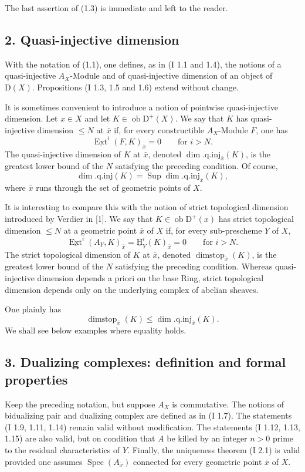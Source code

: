 \documentclass[11pt]{article}
\providecommand{\uH}{\underline{\mathrm H}}
\DeclareMathOperator{\Ext}{Ext}
\DeclareMathOperator{\Spec}{Spec}
\newcommand{\D}{\mathrm{D}}
\newcommand{\ob}{\operatorname{ob}}
\providecommand{\ob}{\operatorname{ob}}
\providecommand{\Spec}{\operatorname{Spec}}
\providecommand{\Spec}{\operatorname{Spec}}
\providecommand{\Spec}{\operatorname{Spec}}
\providecommand{\Spec}{\operatorname{Spec}}
\begin{document}
The last assertion of (1.3) is immediate and left to the reader.

\subsection*{2. Quasi-injective dimension}

With the notation of (1.1), one defines, as in (I 1.1 and 1.4), the notions of a quasi-injective $A_X$-Module and of quasi-injective dimension of an object of $\D(X)$. Propositions (I 1.3, 1.5 and 1.6) extend without change.

It is sometimes convenient to introduce a notion of pointwise quasi-injective dimension. Let $x\in X$ and let $K\in\ob\D^+(X)$. We say that $K$ has quasi-injective dimension $\leq N$ at $\bar{x}$ if, for every constructible $A_X$-Module $F$, one has
\[
        \underline{\Ext}^{i}(F,K)_{\bar{x}}=0\qquad\text{for }i>N.
\]
The quasi-injective dimension of $K$ at $\bar{x}$, denoted $\dim.\mathrm{q.inj}_{\bar{x}}(K)$, is the greatest lower bound of the $N$ satisfying the preceding condition. Of course,
\[
        \dim.\mathrm{q.inj}(K)=\operatorname{Sup}\dim.\mathrm{q.inj}_{\bar{x}}(K),
\]
where $\bar{x}$ runs through the set of geometric points of $X$.

It is interesting to compare this with the notion of strict topological dimension introduced by Verdier in [1]. We say that $K\in\ob\D^+(x)$ has strict topological dimension $\leq N$ at a geometric point $\bar{x}$ of $X$ if, for every sub-prescheme $Y$ of $X$,
\[
        \underline{\Ext}^{i}(A_Y,K)_{\bar{x}}=\uH^i_Y(K)_{\bar{x}}=0\qquad\text{for }i>N.
\]
The strict topological dimension of $K$ at $\bar{x}$, denoted $\operatorname{dimstop}_{\bar{x}}(K)$, is the greatest lower bound of the $N$ satisfying the preceding condition. Whereas quasi-injective dimension depends a priori on the base Ring, strict topological dimension depends only on the underlying complex of abelian sheaves.

One plainly has
\[
        \operatorname{dimstop}_{\bar{x}}(K)\leq \dim.\mathrm{q.inj}_{\bar{x}}(K).
\]
We shall see below examples where equality holds.

\subsection*{3. Dualizing complexes: definition and formal properties}

Keep the preceding notation, but suppose $A_X$ is commutative. The notions of bidualizing pair and dualizing complex are defined as in (I 1.7). The statements (I 1.9, 1.11, 1.14) remain valid without modification. The statements (I 1.12, 1.13, 1.15) are also valid, but on condition that $A$ be killed by an integer $n>0$ prime to the residual characteristics of $Y$. Finally, the uniqueness theorem (I 2.1) is valid provided one assumes $\Spec(A_{\bar{x}})$ connected for every geometric point $\bar{x}$ of $X$.
\end{document}
